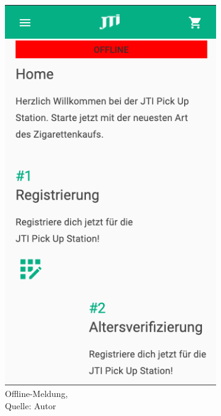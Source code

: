\begin{figure}[H]
	\begin{subfigure}[b]{0.5\textwidth}
		\includegraphics[scale=0.5]{images/offline.PNG}
		\caption[Offline-Meldung]{Offline-Meldung,\\ Quelle: Autor}
		\label{img: offline}
	\end{subfigure}
	\hfill
	\begin{subfigure}[b]{0.5\textwidth}

\end{subfigure}
\end{figure}
